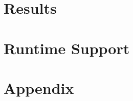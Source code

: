 \documentclass[letter]{book}
\begin{document}
{ 				 %


\part{Results}
\label{part-results}






\part{Runtime Support}
\label{part-runtime}



\part{Appendix}
\appendix

}{


}


%



\end{document}
